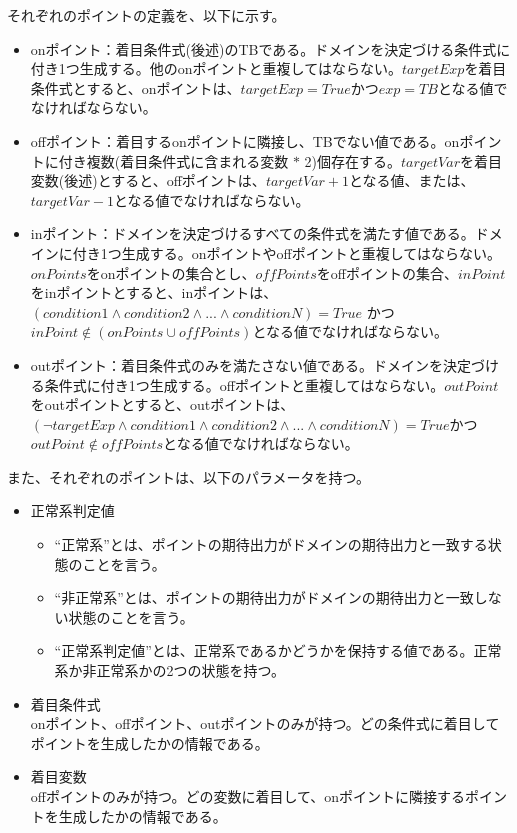 \documentclass[uplatex, report, a4j, 10pt]{jsbook}
\begin{document}
それぞれのポイントの定義を、以下に示す。
\begin{itemize}
  \item onポイント：着目条件式(後述)のTBである。ドメインを決定づける条件式に付き1つ生成する。他のonポイントと重複してはならない。$targetExp$を着目条件式とすると、onポイントは、$targetExp = True$かつ$exp = TB$となる値でなければならない。
  \item offポイント：着目するonポイントに隣接し、TBでない値である。onポイントに付き複数(着目条件式に含まれる変数 $*$ 2)個存在する。$targetVar$を着目変数(後述)とすると、offポイントは、$targetVar + 1$となる値、または、$targetVar - 1$となる値でなければならない。
  \item inポイント：ドメインを決定づけるすべての条件式を満たす値である。ドメインに付き1つ生成する。onポイントやoffポイントと重複してはならない。$onPoints$をonポイントの集合とし、$offPoints$をoffポイントの集合、$inPoint$をinポイントとすると、inポイントは、 $(condition1 \land condition2 \land ... \land conditionN) = True$ かつ $inPoint \notin (onPoints \cup offPoints)$となる値でなければならない。
  \item outポイント：着目条件式のみを満たさない値である。ドメインを決定づける条件式に付き1つ生成する。offポイントと重複してはならない。$outPoint$をoutポイントとすると、outポイントは、$ (\lnot targetExp \land condition1 \land condition2 \land ... \land conditionN) = True$かつ$outPoint \notin offPoints$となる値でなければならない。
\end{itemize}
また、それぞれのポイントは、以下のパラメータを持つ。
\begin{itemize}
  \item 正常系判定値
        \begin{itemize}
          \item ``正常系''とは、ポイントの期待出力がドメインの期待出力と一致する状態のことを言う。
          \item ``非正常系''とは、ポイントの期待出力がドメインの期待出力と一致しない状態のことを言う。
          \item ``正常系判定値''とは、正常系であるかどうかを保持する値である。正常系か非正常系かの2つの状態を持つ。
        \end{itemize}
  \item 着目条件式\\
        onポイント、offポイント、outポイントのみが持つ。どの条件式に着目してポイントを生成したかの情報である。
  \item 着目変数\\
        offポイントのみが持つ。どの変数に着目して、onポイントに隣接するポイントを生成したかの情報である。
\end{itemize}
\end{document}
